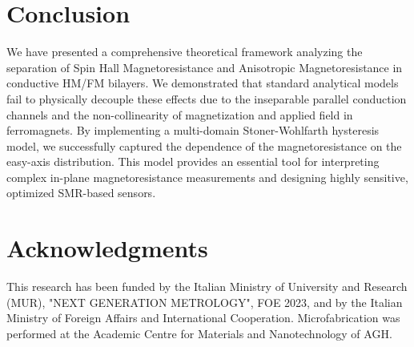 \documentclass[11pt,a4paper]{article}
\begin{document}
\section{Conclusion}
We have presented a comprehensive theoretical framework analyzing the separation of Spin Hall Magnetoresistance and Anisotropic Magnetoresistance in conductive HM/FM bilayers. We demonstrated that standard analytical models fail to physically decouple these effects due to the inseparable parallel conduction channels and the non-collinearity of magnetization and applied field in ferromagnets. By implementing a multi-domain Stoner-Wohlfarth hysteresis model, we successfully captured the dependence of the magnetoresistance on the easy-axis distribution. This model provides an essential tool for interpreting complex in-plane magnetoresistance measurements and designing highly sensitive, optimized SMR-based sensors.

\section*{Acknowledgments}
This research has been funded by the Italian Ministry of University and Research (MUR), "NEXT GENERATION METROLOGY", FOE 2023, and by the Italian Ministry of Foreign Affairs and International Cooperation. Microfabrication was performed at the Academic Centre for Materials and Nanotechnology of AGH. 



\end{document}

